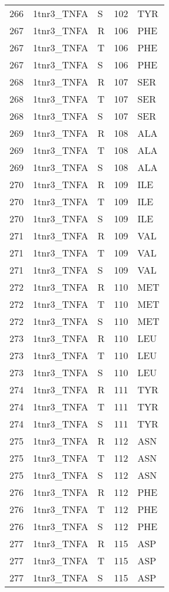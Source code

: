 \begin{longtable}[l]{l|l|l|l|l}
	266 & 1tnr3_TNFA & S & 102 & TYR \\
	267 & 1tnr3_TNFA & R & 106 & PHE \\
	267 & 1tnr3_TNFA & T & 106 & PHE \\
	267 & 1tnr3_TNFA & S & 106 & PHE \\
	268 & 1tnr3_TNFA & R & 107 & SER \\
	268 & 1tnr3_TNFA & T & 107 & SER \\
	268 & 1tnr3_TNFA & S & 107 & SER \\
	269 & 1tnr3_TNFA & R & 108 & ALA \\
	269 & 1tnr3_TNFA & T & 108 & ALA \\
	269 & 1tnr3_TNFA & S & 108 & ALA \\
	270 & 1tnr3_TNFA & R & 109 & ILE \\
	270 & 1tnr3_TNFA & T & 109 & ILE \\
	270 & 1tnr3_TNFA & S & 109 & ILE \\
	271 & 1tnr3_TNFA & R & 109 & VAL \\
	271 & 1tnr3_TNFA & T & 109 & VAL \\
	271 & 1tnr3_TNFA & S & 109 & VAL \\
	272 & 1tnr3_TNFA & R & 110 & MET \\
	272 & 1tnr3_TNFA & T & 110 & MET \\
	272 & 1tnr3_TNFA & S & 110 & MET \\
	273 & 1tnr3_TNFA & R & 110 & LEU \\
	273 & 1tnr3_TNFA & T & 110 & LEU \\
	273 & 1tnr3_TNFA & S & 110 & LEU \\
	274 & 1tnr3_TNFA & R & 111 & TYR \\
	274 & 1tnr3_TNFA & T & 111 & TYR \\
	274 & 1tnr3_TNFA & S & 111 & TYR \\
	275 & 1tnr3_TNFA & R & 112 & ASN \\
	275 & 1tnr3_TNFA & T & 112 & ASN \\
	275 & 1tnr3_TNFA & S & 112 & ASN \\
	276 & 1tnr3_TNFA & R & 112 & PHE \\
	276 & 1tnr3_TNFA & T & 112 & PHE \\
	276 & 1tnr3_TNFA & S & 112 & PHE \\
	277 & 1tnr3_TNFA & R & 115 & ASP \\
	277 & 1tnr3_TNFA & T & 115 & ASP \\
	277 & 1tnr3_TNFA & S & 115 & ASP \\

\end{longtable}
